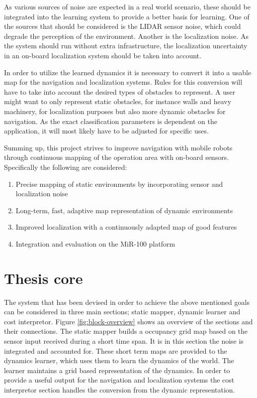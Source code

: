  
As various sources of noise are expected in a real world scenario, these should be integrated into the learning system to provide a better basis for learning. One of the sources that should be considered is the LIDAR sensor noise, which could degrade the perception of the environment. 
Another is the localization noise.
As the system should run without extra infrastructure, the localization uncertainty in an on-board localization system should be taken into account.


In order to utilize the learned dynamics it is necessary to convert it into a usable map for the navigation and localization systems. Rules for this conversion will have to take into account the desired types of obstacles to represent. 
A user might want to only represent static obstacles, for instance walls and heavy machinery, for localization purposes but also more dynamic obstacles for navigation. 
As the exact classification parameters is dependent on the  application, it will most likely have to be adjusted for specific uses. 

Summing up, this project strives to improve navigation with mobile robots through continuous mapping of the operation area with on-board sensors. 
Specifically the following are considered:
\begin{enumerate}
    \item Precise mapping of static environments by incorporating sensor and localization noise
    \item Long-term, fast, adaptive map representation of dynamic environments
    \item Improved localization with a continuously adapted map of good features
    \item Integration and evaluation on the MiR-100 platform
\end{enumerate}

\section{Thesis core}
The system that has been devised in order to achieve the above mentioned goals can be considered in three main sections; static mapper, dynamic learner and cost interpretor. 
Figure \ref{fig:block-overview} shows an overview of the sections and their connections. 
The static mapper builds a occupancy grid map based on the sensor input received during a short time span. It is in this section the noise is integrated and accounted for. 
These short term maps are provided to the dynamics learner, which uses them to learn the dynamics of the world. 
The learner maintains a grid based representation of the dynamics. 
In order to provide a useful output for the navigation and localization systems the cost interpretor section handles the conversion from the dynamic representation. 

